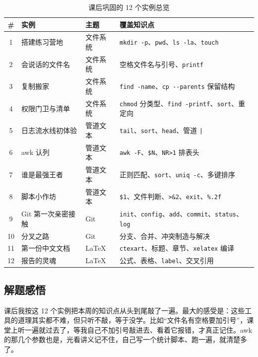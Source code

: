 \documentclass[a4paper, 12pt]{article}
\begin{document}
\begin{table}[h]
  \centering
  \small
  \begin{tabular}{cllp{7.0cm}}
    \toprule
    \textbf{\#} & \textbf{实例} & \textbf{主题} & \textbf{覆盖知识点} \\
    \midrule
    1 & 搭建练习营地 & 文件系统 & \texttt{mkdir -p}、\texttt{pwd}、\texttt{ls -la}、\texttt{touch} \\
    2 & 会说话的文件名 & 文件系统 & 空格文件名与引号、\texttt{printf} \\
    3 & 复制搬家 & 文件系统 & \texttt{find -name}、\texttt{cp -{}-parents} 保留结构 \\
    4 & 权限门卫与清单 & 文件系统 & \texttt{chmod} 分类型、\texttt{find -printf}、\texttt{sort}、重定向 \\
    5 & 日志流水线初体验 & 管道文本 & \texttt{tail}、\texttt{sort}、\texttt{head}、管道 \texttt{|} \\
    6 & awk 认列 & 管道文本 & \texttt{awk -F}、\texttt{\$N}、\texttt{NR>1} 排表头 \\
    7 & 谁是最强王者 & 管道文本 & 正则匹配、\texttt{sort}、\texttt{uniq -c}、多键排序 \\
    8 & 脚本小作坊 & 管道文本 & \texttt{\$1}、文件判断、\texttt{>\&2}、\texttt{exit}、\texttt{\%.2f} \\
    9 & Git 第一次亲密接触 & Git & \texttt{init}、\texttt{config}、\texttt{add}、\texttt{commit}、\texttt{status}、\texttt{log} \\
    10 & 分叉之路 & Git & 分支、合并、冲突制造与解决 \\
    11 & 第一份中文文档 & \LaTeX{} & \texttt{ctexart}、标题、章节、\texttt{xelatex} 编译 \\
    12 & 报告的灵魂 & \LaTeX{} & 公式、表格、\texttt{label}、交叉引用 \\
    \bottomrule
  \end{tabular}
  \caption{课后巩固的 12 个实例总览}
  \label{tab:practice}
\end{table}

\subsection{解题感悟}

课后我按这 12 个实例把本周的知识点从头到尾敲了一遍。最大的感受是：这些工具的道理其实都不难，但只听不敲，等于没学。比如“文件名有空格要加引号”，课堂上听一遍就过去了，等我自己不加引号敲进去、看着它报错，才真正记住。awk 的那几个参数也是，光看讲义记不住，自己写一个统计脚本、跑一遍，就清楚多了。
\end{document}
